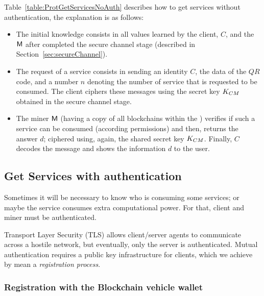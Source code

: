 Table~\ref{table:ProtGetServicesNoAuth} describes how to get services without authentication,
the explanation is as follows:
\begin{itemize}
  \item  The initial knowledge consists in all values learned by the client, $C$, and the 
    \blockchaincarnetwork~ $\textsf{M}$ after completed the secure channel stage 
    (described in Section~\ref{sec:secureChannel}).
   \item The request of a service consists in sending an identity $C$, the data of the $QR$ code, and a 
        number $n$ denoting the number of service that is requested to be consumed. 
        The client ciphers  these messages using the secret key $K_{CM}$ obtained in
        the secure channel stage. 
   \item The miner $\textsf{M}$ (having a copy of all blockchains within the \blockchaincarnetwork) verifies 
        if such a service can be consumed (according permissions) and then, 
        returns the answer $d$; ciphered using, again, the shared secret key $K_{CM}$. Finally,
        $C$ decodes the message and shows the information $d$ to the user.
\end{itemize}




\subsection{Get Services with authentication}
\label{ssec:ServAuth}
Sometimes it will be necessary to know who is consuming some services; or maybe the service consumes extra 
computational power. For that, client and miner must be authenticated. 

Transport Layer Security (TLS) allows client/server agents to communicate 
across a hostile network, but eventually, only the server is authenticated. 
Mutual authentication requires a public key infrastructure for clients, which
we achieve by mean a \textit{registration process}. 

\subsubsection{Registration with the Blockchain vehicle wallet}
\label{sec:Registration}

